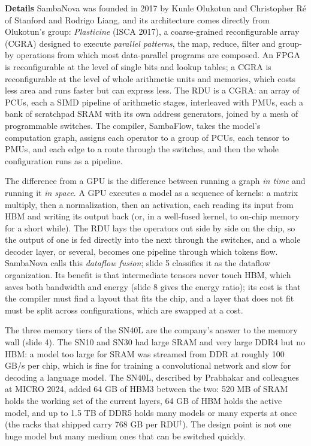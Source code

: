 \documentclass[11pt,letterpaper]{article}
\newcommand{\para}[1]{\medskip\noindent\textbf{#1}\quad}
\begin{document}
\para{Details} SambaNova was founded in 2017 by Kunle Olukotun and Christopher R\'e of Stanford and Rodrigo Liang, and its architecture comes directly from Olukotun's group: \emph{Plasticine} (ISCA 2017), a coarse-grained reconfigurable array (CGRA) designed to execute \emph{parallel patterns}, the map, reduce, filter and group-by operations from which most data-parallel programs are composed. An FPGA is reconfigurable at the level of single bits and lookup tables; a CGRA is reconfigurable at the level of whole arithmetic units and memories, which costs less area and runs faster but can express less. The RDU is a CGRA: an array of PCUs, each a SIMD pipeline of arithmetic stages, interleaved with PMUs, each a bank of scratchpad SRAM with its own address generators, joined by a mesh of programmable switches. The compiler, SambaFlow, takes the model's computation graph, assigns each operator to a group of PCUs, each tensor to PMUs, and each edge to a route through the switches, and then the whole configuration runs as a pipeline.

The difference from a GPU is the difference between running a graph \emph{in time} and running it \emph{in space}. A GPU executes a model as a sequence of kernels: a matrix multiply, then a normalization, then an activation, each reading its input from HBM and writing its output back (or, in a well-fused kernel, to on-chip memory for a short while). The RDU lays the operators out side by side on the chip, so the output of one is fed directly into the next through the switches, and a whole decoder layer, or several, becomes one pipeline through which tokens flow. SambaNova calls this \emph{dataflow fusion}; slide 5 classifies it as the dataflow organization. Its benefit is that intermediate tensors never touch HBM, which saves both bandwidth and energy (slide 8 gives the energy ratio); its cost is that the compiler must find a layout that fits the chip, and a layer that does not fit must be split across configurations, which are swapped at a cost.

The three memory tiers of the SN40L are the company's answer to the memory wall (slide 4). The SN10 and SN30 had large SRAM and very large DDR4 but no HBM: a model too large for SRAM was streamed from DDR at roughly 100 GB/s per chip, which is fine for training a convolutional network and slow for decoding a language model. The SN40L, described by Prabhakar and colleagues at MICRO 2024, added 64 GB of HBM3 between the two: 520 MB of SRAM holds the working set of the current layers, 64 GB of HBM holds the active model, and up to 1.5 TB of DDR5 holds many models or many experts at once (the racks that shipped carry 768 GB per RDU$^\dagger$). The design point is not one huge model but many medium ones that can be switched quickly.
\end{document}
